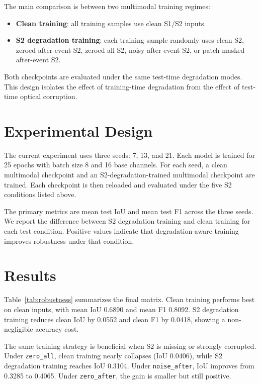 \documentclass[review]{elsarticle}
\begin{document}
The main comparison is between two multimodal training regimes:

\begin{itemize}
  \item \textbf{Clean training}: all training samples use clean S1/S2 inputs.
  \item \textbf{S2 degradation training}: each training sample randomly uses
  clean S2, zeroed after-event S2, zeroed all S2, noisy after-event S2, or
  patch-masked after-event S2.
\end{itemize}

Both checkpoints are evaluated under the same test-time degradation modes. This
design isolates the effect of training-time degradation from the effect of
test-time optical corruption.

\section{Experimental Design}

The current experiment uses three seeds: 7, 13, and 21. Each model is trained
for 25 epochs with batch size 8 and 16 base channels. For each seed, a clean
multimodal checkpoint and an S2-degradation-trained multimodal checkpoint are
trained. Each checkpoint is then reloaded and evaluated under the five S2
conditions listed above.

The primary metrics are mean test IoU and mean test F1 across the three seeds.
We report the difference between S2 degradation training and clean training for
each test condition. Positive values indicate that degradation-aware training
improves robustness under that condition.

\section{Results}

Table~\ref{tab:robustness} summarizes the final matrix. Clean training performs
best on clean inputs, with mean IoU 0.6890 and mean F1 0.8092. S2 degradation
training reduces clean IoU by 0.0552 and clean F1 by 0.0418, showing a
non-negligible accuracy cost.

The same training strategy is beneficial when S2 is missing or strongly
corrupted. Under \texttt{zero\_all}, clean training nearly collapses
(IoU 0.0406), while S2 degradation training reaches IoU 0.3104. Under
\texttt{noise\_after}, IoU improves from 0.3285 to 0.4065. Under
\texttt{zero\_after}, the gain is smaller but still positive.
\end{document}
